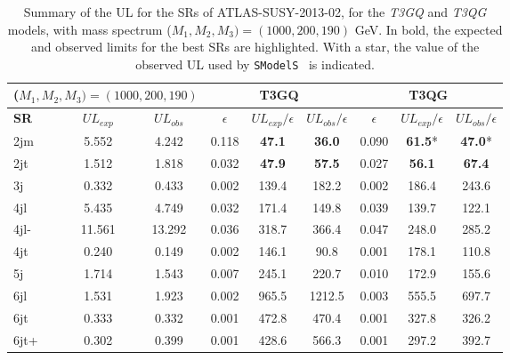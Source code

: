 \documentclass[a4paper,11pt]{article}
\newcommand{\SMO}{\texttt{SModelS\xspace}}
\begin{document}
\begin{table}[h]
	\centering
	\renewcommand\arraystretch{1.2} 
	\scriptsize
	\begin{tabular}{ l c c    c c c  |  c c c  }
		\toprule \toprule
		\multicolumn{3}{c}{($M_1,M_2,M_3) = (1000,200,190)$} & \multicolumn{3}{c}{ \textbf{T3GQ}} & \multicolumn{3}{c}{ \textbf{T3QG}} \\  \toprule 
		\textbf{SR} & $UL_{exp}$ & $UL_{obs}$ & $\epsilon$ &  $UL_{exp}/\epsilon$ & $UL_{obs}/\epsilon$ & $\epsilon$ & $UL_{exp}/ \epsilon$ & $UL_{obs}/ \epsilon$ \\
		2jm & 5.552 &  4.242 &  0.118  & \textbf{47.1} &  \textbf{36.0}  &  0.090 &  \textbf{61.5}*  & \textbf{47.0}*\\
		2jt  & 1.512  & 1.818 &  0.032  & \textbf{47.9} &  \textbf{57.5}  &  0.027 &  \textbf{56.1}  & \textbf{67.4} \\
		3j &  0.332 &  0.433  & 0.002 &  139.4 &  182.2  &  0.002 &  186.4 &  243.6 \\ 
		4jl  & 5.435 &  4.749  & 0.032  & 171.4  & 149.8  &  0.039 &  139.7  & 122.1 \\
		4jl-  & 11.561 &  13.292 &  0.036  & 318.7 &  366.4  &  0.047 &  248.0 &  285.2 \\
		4jt  & 0.240  & 0.149  & 0.002  & 146.1  & 90.8 &   0.001  & 178.1  & 110.8 \\
		5j  & 1.714  & 1.543  & 0.007 &  245.1 &  220.7  &  0.010  & 172.9  & 155.6 \\
		6jl  & 1.531  & 1.923  & 0.002  & 965.5 &  1212.5  & 0.003  & 555.5 &  697.7 \\
		6jt &  0.333  & 0.332 &  0.001  & 472.8  & 470.4 &  0.001 &  327.8  & 326.2 \\
		6jt+  & 0.302 &  0.399 &  0.001  & 428.6  & 566.3  & 0.001  & 297.2  & 392.7 \\
		\bottomrule \bottomrule
	\end{tabular}
	\caption{Summary of the UL for the SRs of ATLAS-SUSY-2013-02, for the \textit{T3GQ} and \textit{T3QG} models, with mass spectrum ($M_1,M_2,M_3) = (1000,200,190)$ GeV. In bold, the expected and observed limits for the best SRs are highlighted. With a star, the value of the observed UL used by \SMO~ is indicated.}
	\label{ATLAS02_UL}
\end{table}
\end{document}
